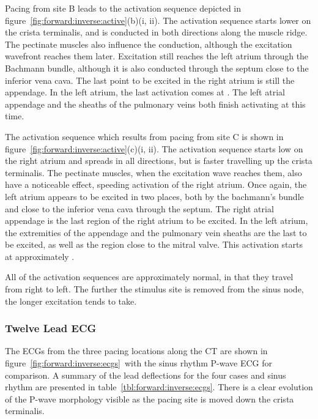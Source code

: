 Pacing from site B leads to the activation sequence depicted in
figure~\ref{fig:forward:inverse:active}(b)(i, ii).
The activation sequence starts lower on the crista terminalis, and is conducted
in both directions along the muscle ridge.
The pectinate muscles also influence the conduction, although the excitation
wavefront reaches them later.
Excitation still reaches the left atrium through the Bachmann bundle, although
it is also conducted through the septum close to the inferior vena cava.
The last point to be excited in the right atrium is still the appendage.
In the left atrium, the last activation comes at .
The left atrial appendage and the sheaths of the pulmonary veins both finish
activating at this time.

The activation sequence which results from pacing from site C is shown in
figure~\ref{fig:forward:inverse:active}(c)(i, ii).
The activation sequence starts low on the right atrium and spreads in all
directions, but is faster travelling up the crista terminalis.
The pectinate muscles, when the excitation wave reaches them, also have a
noticeable effect, speeding activation of the right atrium.
Once again, the left atrium appears to be excited in two places, both by the
bachmann's bundle and close to the inferior vena cava through the septum.
The right atrial appendage is the last region of the right atrium to be excited.
In the left atrium, the extremities of the appendage and the pulmonary vein
sheaths are the last to be excited, as well as the region close to the mitral
valve.
This activation starts at approximately .

All of the activation sequences are approximately normal, in that they travel
from right to left.
The further the stimulus site is removed from the sinus node, the longer
excitation tends to take.


\subsubsection{Twelve Lead ECG}

The ECGs from the three pacing locations along the CT are shown in
figure~\ref{fig:forward:inverse:ecgs}\ with the sinus rhythm P-wave ECG for
comparison.
A summary of the lead deflections for the four cases and sinus rhythm are
presented in table~\ref{tbl:forward:inverse:ecgs}.
There is a clear evolution of the P-wave morphology visible as the pacing site
is moved down the crista terminalis.

